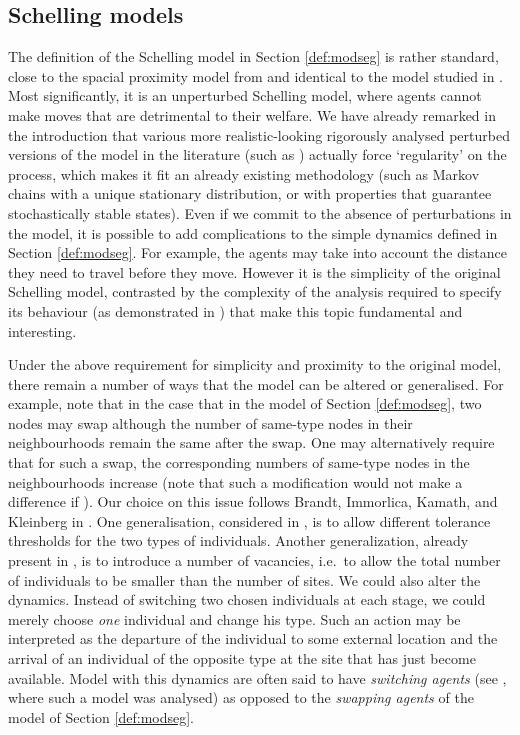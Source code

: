 \documentclass[11pt]{article}
\theoremstyle{plain}
\numberwithin{equation}{subsection}
\begin{document}
\subsection{Schelling models}\label{ssub:varschel}
The definition of the Schelling model in Section \ref{def:modseg} is rather standard, close to
the spacial proximity model from  \cite{TS1, TS71a}  and identical to
the model studied in \cite{brandt:an, BELschel13}. 
Most significantly, it is an unperturbed Schelling model, where agents cannot
make moves that are detrimental to their welfare.
We have already remarked in the introduction
that various more realistic-looking rigorously analysed perturbed versions of the model 
in the literature (such as \cite{JZ1}) actually force `regularity' on the process, which
makes it fit an already existing methodology 
(such as Markov chains with a unique stationary distribution, 
or with properties that guarantee stochastically stable states).
Even if we commit to the absence of perturbations in the model, 
it is possible to add complications to the simple dynamics defined in
Section \ref{def:modseg}. For example, the agents
may take into account the distance they need to travel before they move.
However it is the simplicity of the original Schelling model,
contrasted by  the complexity of the analysis required to specify its behaviour
(as demonstrated in \cite{brandt:an, BELschel13}) 
that make this topic fundamental and interesting.

Under the above requirement for simplicity and proximity to the original model,
there remain a number of ways that the model can be altered or generalised.
For example, note that in the case that  in the model of
Section  \ref{def:modseg}, two nodes may swap although the number of
same-type nodes in their neighbourhoods remain the same after the swap.
One may alternatively require that for such a swap, the corresponding
numbers of same-type nodes in the neighbourhoods increase
(note that such a modification would not make a difference if ).
Our choice on this issue follows Brandt, Immorlica, Kamath, and Kleinberg in
\cite[Section 2]{brandt:an}.
One generalisation, considered in \cite{BELtipl13}, is to allow
different tolerance thresholds for the two types of
individuals. Another generalization, already present in \cite{TS1}, is to introduce a number
of vacancies, i.e.\ to allow the total number of individuals to 
be smaller than the number of sites. 
We could also alter the dynamics. Instead
of switching two chosen individuals at each stage, we could merely choose {\em one}
individual and change his type. Such an action may be 
interpreted as the departure of the individual to some external location and the arrival of an 
individual of the opposite type at the site that has just become available. 
Model with this dynamics are often said to have {\em switching agents}
(see \cite{BELtipl13}, where such a model was analysed) as opposed to the 
{\em swapping agents} of the model of Section \ref{def:modseg}. 
\end{document}
